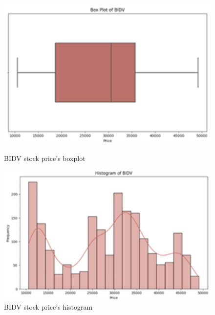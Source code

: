 \documentclass{ieeeojies}
\begin{document}
\begin{figure}[H]
    \centering
    \begin{minipage}{0.23\textwidth}
    \centering
    \includegraphics[width=1\textwidth]{bibliography/Figure/BIDVboxplot.png}
    \caption{BIDV stock price's boxplot}
    \label{fig:1}
    \end{minipage}
    \hfill
    \begin{minipage}{0.23\textwidth}
    \centering
    \includegraphics[width=1\textwidth]{bibliography/Figure/BIDVhist.png}
    \caption{BIDV stock price's histogram}
    \label{fig:2}
    \end{minipage}
\end{figure}
\end{document}
